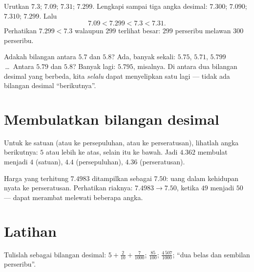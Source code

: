 \begin{example}\label{ex:g5:decimals:order}
Urutkan $7.3$; $7.09$; $7.31$; $7.299$. Lengkapi sampai tiga angka
desimal: $7.300$; $7.090$; $7.310$; $7.299$. Lalu
\[
7.09 < 7.299 < 7.3 < 7.31 .
\]
Perhatikan $7.299 < 7.3$ walaupun $299$ terlihat besar: $299$
perseribu melawan $300$ perseribu.
\end{example}

\begin{example}\label{ex:g5:decimals:between}
Adakah bilangan antara $5.7$ dan $5.8$? Ada, banyak sekali: $5.75$,
$5.71$, $5.799$\,\dots\ Antara $5.79$ dan $5.8$? Banyak lagi:
$5.795$, misalnya. Di antara dua bilangan desimal yang berbeda, kita
\emph{selalu} dapat menyelipkan satu lagi --- tidak ada bilangan
desimal ``berikutnya''.
\end{example}

\section{Membulatkan bilangan desimal}

\begin{definition}[Pembulatan]\label{def:g5:decimals:round}
Untuk  ke satuan (atau ke persepuluhan, atau ke
perseratusan), lihatlah angka berikutnya: $5$ atau lebih 
ke atas, selain itu  ke bawah. Jadi $4.362$ membulat
menjadi $4$ (satuan), $4.4$ (persepuluhan), $4.36$ (perseratusan).
\end{definition}

\begin{example}\label{ex:g5:decimals:money}
Harga yang terhitung $7.4983$ ditampilkan sebagai $7.50$: 
uang dalam kehidupan nyata  ke perseratusan. Perhatikan
riaknya: $7.4983 \to
7.50$, ketika $49$ menjadi $50$ ---  dapat merambat
melewati beberapa angka.
\end{example}

\section{Latihan}

\begin{exercise}[$\star$]\label{exo:g5:decimals:1}
Tulislah sebagai bilangan desimal: $5 + \frac{2}{10} + \frac{7}{1000}$;
\quad $\frac{85}{100}$; \quad $\frac{4\,507}{1000}$; \quad ``dua
belas dan sembilan perseribu''.
\end{exercise}

